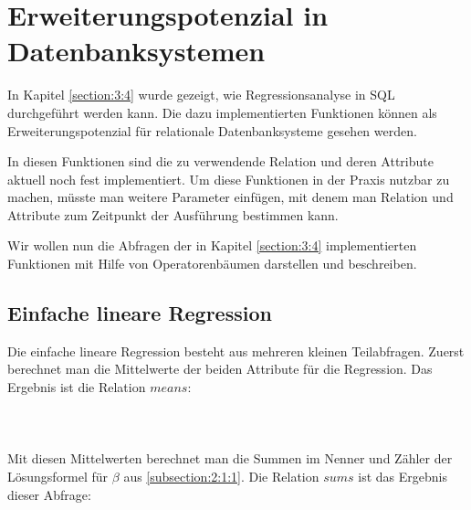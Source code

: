 \chapter{Erweiterungspotenzial in Datenbanksystemen}
\label{chapter:5}

In Kapitel \ref{section:3:4} wurde gezeigt, wie Regressionsanalyse in SQL durchgeführt werden kann. Die dazu implementierten Funktionen können als Erweiterungspotenzial für relationale Datenbanksysteme gesehen werden.

In diesen Funktionen sind die zu verwendende Relation und deren Attribute aktuell noch fest implementiert. Um diese Funktionen in der Praxis nutzbar zu machen, müsste man weitere Parameter einfügen, mit denem man Relation und Attribute zum Zeitpunkt der Ausführung bestimmen kann.

Wir wollen nun die Abfragen der in Kapitel \ref{section:3:4} implementierten Funktionen mit Hilfe von Operatorenbäumen darstellen und beschreiben.

\section{Einfache lineare Regression}
\label{section:5:1}

Die einfache lineare Regression besteht aus mehreren kleinen Teilabfragen. Zuerst berechnet man die Mittelwerte der beiden Attribute für die Regression. Das Ergebnis ist die Relation $means$:
\\\\
\noindent{}
\\\\
Mit diesen Mittelwerten berechnet man die Summen im Nenner und Zähler der Lösungsformel für $\beta$ aus \ref{subsection:2:1:1}. Die Relation $sums$ ist das Ergebnis dieser Abfrage:
\\\\
\noindent{}
\\\\

